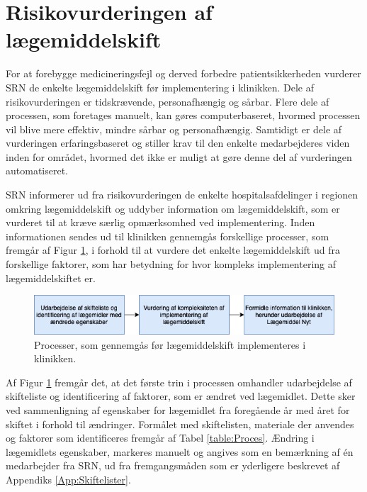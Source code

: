 \section{Risikovurderingen af lægemiddelskift} \label{sec:ImpLaeg}
For at forebygge medicineringsfejl og derved forbedre patientsikkerheden vurderer SRN de enkelte lægemiddelskift før implementering i klinikken. Dele af risikovurderingen er tidskrævende, personafhængig og sårbar. Flere dele af processen, som foretages manuelt, kan gøres computerbaseret, hvormed processen vil blive mere effektiv, mindre sårbar og personafhængig. Samtidigt er dele af vurderingen erfaringsbaseret og stiller krav til den enkelte medarbejderes viden inden for området, hvormed det ikke er muligt at gøre denne del af vurderingen automatiseret.

SRN informerer ud fra risikovurderingen de enkelte hospitalsafdelinger i regionen omkring lægemiddelskift og uddyber information om lægemiddelskift, som er vurderet til at kræve særlig opmærksomhed ved implementering. Inden informationen sendes ud til klinikken gennemgås forskellige processer, som fremgår af Figur \ref{fig:Proces}, i forhold til at vurdere det enkelte lægemiddelskift ud fra forskellige faktorer, som har betydning for hvor kompleks implementering af lægemiddelskiftet er. 

\begin{figure}[H]\centering	\includegraphics[width=1\textwidth]{billeder/proces.png} 
	\caption{Processer, som gennemgås før lægemiddelskift implementeres i klinikken.}\label{fig:Proces}  
\end{figure}

Af Figur \ref{fig:Proces} fremgår det, at det første trin i processen omhandler udarbejdelse af skifteliste og identificering af faktorer, som er ændret ved lægemidlet. Dette sker ved sammenligning af egenskaber for lægemidlet fra foregående år med året for skiftet i forhold til ændringer. Formålet med skiftelisten, materiale der anvendes og faktorer som identificeres fremgår af Tabel \ref{table:Proces}. Ændring i lægemidlets egenskaber, markeres manuelt og angives som en bemærkning af én medarbejder fra SRN, ud fra fremgangsmåden som er yderligere beskrevet af Appendiks \ref{App:Skiftelister}.

